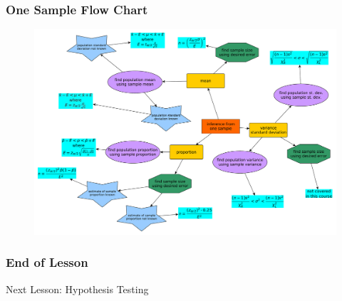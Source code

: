 \documentclass[xcolor=dvipsnames]{beamer}
\begin{document}
\begin{frame}
  \frametitle{One Sample Flow Chart}
  \begin{figure}[h]
    \includegraphics[scale=0.255]{./diagrams/onesample.pdf}
  \end{figure}
\end{frame}

\begin{frame}
  \frametitle{End of Lesson}
Next Lesson: Hypothesis Testing 
\end{frame}
\end{document}
